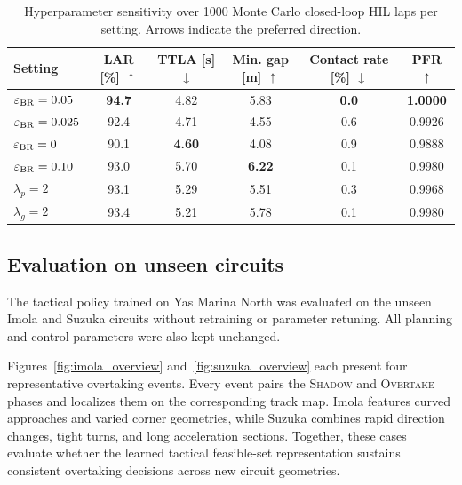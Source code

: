 \documentclass[sensors,article,submit,moreauthors]{Definitions/mdpi}
\begin{document}
\begin{table}[!htbp]
\centering
\footnotesize
\setlength{\tabcolsep}{1.2pt}
\renewcommand{\arraystretch}{1.08}
\caption{Hyperparameter sensitivity over 1000 Monte Carlo closed-loop HIL
laps per setting. Arrows indicate the preferred direction.}
\label{tab:sensitivity}
\begin{tabular}{@{}lccccc@{}}
\toprule
Setting & \shortstack{LAR [\%]\\$\uparrow$} &
\shortstack{TTLA [s]\\$\downarrow$} &
\shortstack{Min. gap [m]\\$\uparrow$} &
\shortstack{Contact rate [\%]\\$\downarrow$} &
\shortstack{PFR\\$\uparrow$} \\
\midrule
$\varepsilon_{\rm BR}=0.05$
& \textbf{94.7} & 4.82 & 5.83 & \textbf{0.0} & \textbf{1.0000} \\
$\varepsilon_{\rm BR}=0.025$
& 92.4 & 4.71 & 4.55 & 0.6 & 0.9926 \\
$\varepsilon_{\rm BR}=0$
& 90.1 & \textbf{4.60} & 4.08 & 0.9 & 0.9888 \\
$\varepsilon_{\rm BR}=0.10$
& 93.0 & 5.70 & \textbf{6.22} & 0.1 & 0.9980 \\
$\lambda_p=2$
& 93.1 & 5.29 & 5.51 & 0.3 & 0.9968 \\
$\lambda_g=2$
& 93.4 & 5.21 & 5.78 & 0.1 & 0.9980 \\
\bottomrule
\end{tabular}
\end{table}

\subsection{Evaluation on unseen circuits}
\label{subsec:unseen_track}

The tactical policy trained on Yas Marina North was evaluated on the
unseen Imola and Suzuka circuits without retraining or parameter retuning. All
planning and control parameters were also kept unchanged.

Figures~\ref{fig:imola_overview} and~\ref{fig:suzuka_overview} each present four
representative overtaking events. Every event pairs the \textsc{Shadow} and
\textsc{Overtake} phases and localizes them on the corresponding track map.
Imola features curved approaches and varied corner geometries, while Suzuka
combines rapid direction changes, tight turns, and long acceleration sections.
Together, these cases evaluate whether the learned tactical feasible-set
representation sustains consistent overtaking decisions across new circuit
geometries.
\end{document}
